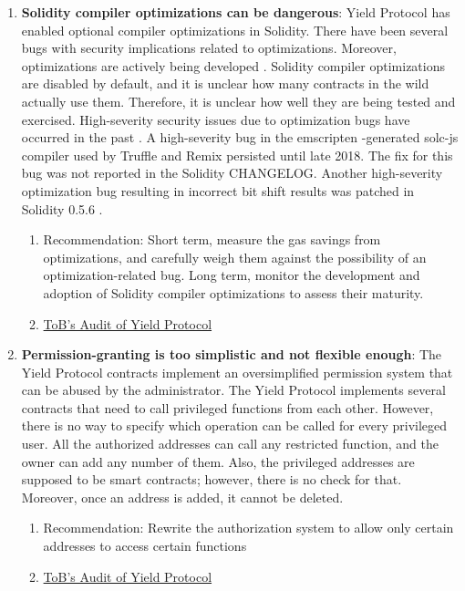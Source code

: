 \begin{enumerate}
\item\textbf{Solidity compiler optimizations can be dangerous}: Yield Protocol has enabled optional compiler optimizations in Solidity. There have been several bugs with security implications related to optimizations. Moreover, optimizations are actively being developed . Solidity compiler optimizations are disabled by default, and it is unclear how many contracts in the wild actually use them. Therefore, it is unclear how well they are being tested and exercised. High-severity security issues due to optimization bugs have occurred in the past . A high-severity bug in the emscripten -generated solc-js compiler used by Truffle and Remix persisted until late 2018. The fix for this bug was not reported in the Solidity CHANGELOG. Another high-severity optimization bug resulting in incorrect bit shift results was patched in Solidity 0.5.6 .
	\begin{enumerate}
	\item Recommendation: Short term, measure the gas savings from optimizations, and carefully weigh them against the possibility of an optimization-related bug. Long term, monitor the development and adoption of Solidity compiler optimizations to assess their maturity.
	\item\href{https://github.com/trailofbits/publications/blob/master/reviews/YieldProtocol.pdf}{ToB's Audit of Yield Protocol}
	\end{enumerate}

\item\textbf{Permission-granting is too simplistic and not flexible enough}: The Yield Protocol contracts implement an oversimplified permission system that can be abused by the administrator. The Yield Protocol implements several contracts that need to call privileged functions from each other. However, there is no way to specify which operation can be called for every privileged user. All the authorized addresses can call any restricted function, and the owner can add any number of them. Also, the privileged addresses are supposed to be smart contracts; however, there is no check for that. Moreover, once an address is added, it cannot be deleted.
	\begin{enumerate}
	\item Recommendation: Rewrite the authorization system to allow only certain addresses to access certain functions
	\item\href{https://github.com/trailofbits/publications/blob/master/reviews/YieldProtocol.pdf}{ToB's Audit of Yield Protocol}
	\end{enumerate}


\end{enumerate}
